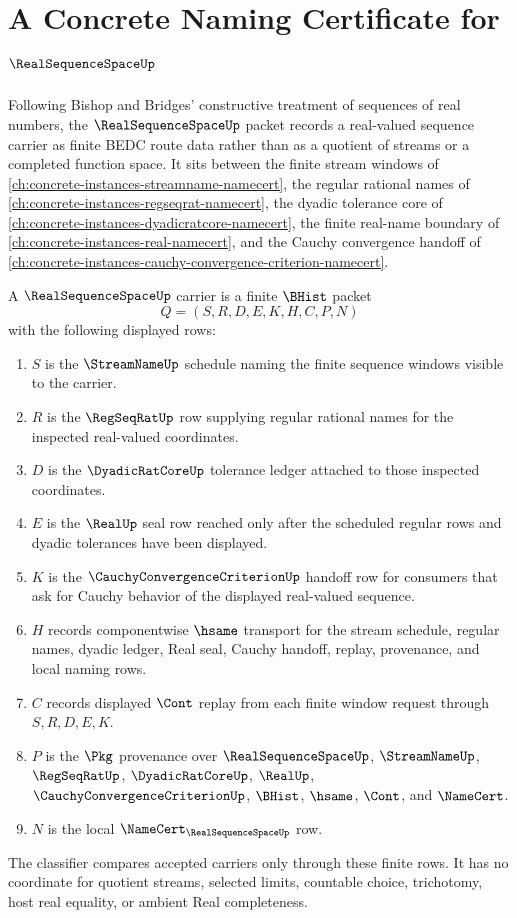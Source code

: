 \chapter{A Concrete Naming Certificate for $\RealSequenceSpaceUp$}
\label{ch:concrete-instances-real-sequence-space-namecert}

Following Bishop and Bridges' constructive treatment of sequences of real numbers, the $\RealSequenceSpaceUp$ packet records a real-valued sequence carrier as finite BEDC route data rather than as a quotient of streams or a completed function space. It sits between the finite stream windows of \autoref{ch:concrete-instances-streamname-namecert}, the regular rational names of \autoref{ch:concrete-instances-regseqrat-namecert}, the dyadic tolerance core of \autoref{ch:concrete-instances-dyadicratcore-namecert}, the finite real-name boundary of \autoref{ch:concrete-instances-real-namecert}, and the Cauchy convergence handoff of \autoref{ch:concrete-instances-cauchy-convergence-criterion-namecert}.

\begin{definition}
\label{def:real-sequence-space-carrier}
A $\RealSequenceSpaceUp$ carrier is a finite $\BHist$ packet
$$
Q=(S,R,D,E,K,H,C,P,N)
$$
with the following displayed rows:
\begin{enumerate}
\item $S$ is the $\StreamNameUp$ schedule naming the finite sequence windows visible to the carrier.
\item $R$ is the $\RegSeqRatUp$ row supplying regular rational names for the inspected real-valued coordinates.
\item $D$ is the $\DyadicRatCoreUp$ tolerance ledger attached to those inspected coordinates.
\item $E$ is the $\RealUp$ seal row reached only after the scheduled regular rows and dyadic tolerances have been displayed.
\item $K$ is the $\CauchyConvergenceCriterionUp$ handoff row for consumers that ask for Cauchy behavior of the displayed real-valued sequence.
\item $H$ records componentwise $\hsame$ transport for the stream schedule, regular names, dyadic ledger, Real seal, Cauchy handoff, replay, provenance, and local naming rows.
\item $C$ records displayed $\Cont$ replay from each finite window request through $S,R,D,E,K$.
\item $P$ is the $\Pkg$ provenance over $\RealSequenceSpaceUp$, $\StreamNameUp$, $\RegSeqRatUp$, $\DyadicRatCoreUp$, $\RealUp$, $\CauchyConvergenceCriterionUp$, $\BHist$, $\hsame$, $\Cont$, and $\NameCert$.
\item $N$ is the local $\NameCert_{\RealSequenceSpaceUp}$ row.
\end{enumerate}
The classifier compares accepted carriers only through these finite rows. It has no coordinate for quotient streams, selected limits, countable choice, trichotomy, host real equality, or ambient Real completeness.
\end{definition}

